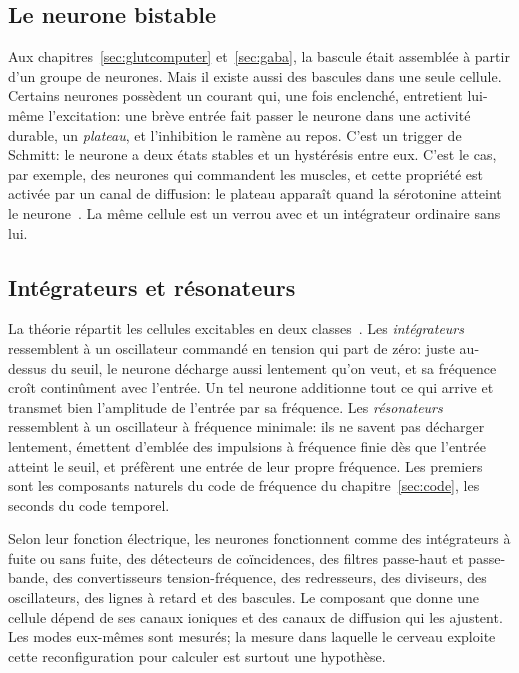 \subsection{Le neurone bistable}
\label{sec:bistable}

Aux chapitres~\ref{sec:glutcomputer} et~\ref{sec:gaba}, la bascule était assemblée à partir d'un groupe de neurones. Mais il existe aussi des bascules dans une seule cellule. Certains neurones possèdent un courant qui, une fois enclenché, entretient lui-même l'excitation: une brève entrée fait passer le neurone dans une activité durable, un \emph{plateau}, et l'inhibition le ramène au repos. C'est un trigger de Schmitt: le neurone a deux états stables et un hystérésis entre eux. C'est le cas, par exemple, des neurones  qui commandent les muscles, et cette propriété est activée par un canal de diffusion: le plateau apparaît quand la sérotonine atteint le neurone~\cite{Hounsgaard1988}. La même cellule est un verrou avec  et un intégrateur ordinaire sans lui.

\subsection{Intégrateurs et résonateurs}

La théorie répartit les cellules excitables en deux classes~\cite{Izhikevich2007}. Les \emph{intégrateurs} ressemblent à un oscillateur commandé en tension qui part de zéro: juste au-dessus du seuil, le neurone décharge aussi lentement qu'on veut, et sa fréquence croît continûment avec l'entrée. Un tel neurone additionne tout ce qui arrive et transmet bien l'amplitude de l'entrée par sa fréquence. Les \emph{résonateurs} ressemblent à un oscillateur à fréquence minimale: ils ne savent pas décharger lentement, émettent d'emblée des impulsions à fréquence finie dès que l'entrée atteint le seuil, et préfèrent une entrée de leur propre fréquence. Les premiers sont les composants naturels du code de fréquence du chapitre~\ref{sec:code}, les seconds du code temporel.

\begin{keyblock}
\begin{proposition}
\label{prop:eetypes}
Selon leur fonction électrique, les neurones fonctionnent comme des intégrateurs à fuite ou sans fuite, des détecteurs de coïncidences, des filtres passe-haut et passe-bande, des convertisseurs tension-fréquence, des redresseurs, des diviseurs, des oscillateurs, des lignes à retard et des bascules. Le composant que donne une cellule dépend de ses canaux ioniques et des canaux de diffusion qui les ajustent. Les modes eux-mêmes sont mesurés; la mesure dans laquelle le cerveau exploite cette reconfiguration pour calculer est surtout une hypothèse.
\end{proposition}
\end{keyblock}

